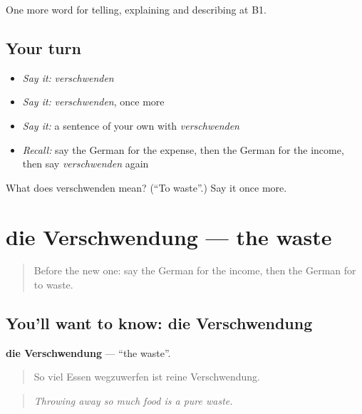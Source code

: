 \begin{grammarlens}[title={What you've built}]
One more word for telling, explaining and describing at B1.
\end{grammarlens}

\subsection*{Your turn}
\begin{itemize}
\raggedright
  \item \emph{Say it:} \emph{verschwenden}
  \item \emph{Say it:} \emph{verschwenden}, once more
  \item \emph{Say it:} a sentence of your own with \emph{verschwenden}
  \item \emph{Recall:} say the German for the expense, then the German for the income, then say \emph{verschwenden} again
\end{itemize}

\begin{tcolorbox}[breakable,colback=teal!4,colframe=teal!35!black,title={Before you move on}]
What does verschwenden mean? (\textquotedblleft{}To waste\textquotedblright{}.) Say it once more.
\end{tcolorbox}
\section[die Verschwendung]{die Verschwendung — the waste}

\label{lesson:GE-C390-verschwendung}



\begin{quote}
Before the new one: say the German for the income, then the German for to waste.
\end{quote}

\subsection*{You'll want to know: die Verschwendung}
\textbf{die Verschwendung} — \textquotedblleft{}the waste\textquotedblright{}.

\begin{quote}
So viel Essen wegzuwerfen ist reine Verschwendung.
\end{quote}

\begin{quote}
\emph{Throwing away so much food is a pure waste.}
\end{quote}


